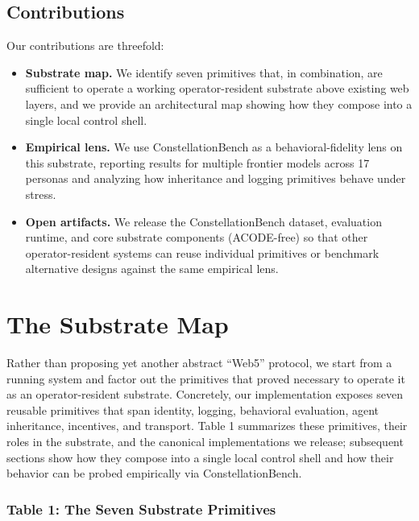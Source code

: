 \documentclass{article}
\providecommand{\tightlist}{\setlength{\itemsep}{0pt}\setlength{\parskip}{0pt}}
\begin{document}
\subsection{Contributions}\label{contributions}

Our contributions are threefold:

\begin{itemize}
\tightlist
\item
  \textbf{Substrate map.} We identify seven primitives that, in
  combination, are sufficient to operate a working operator-resident
  substrate above existing web layers, and we provide an architectural
  map showing how they compose into a single local control shell.
\item
  \textbf{Empirical lens.} We use ConstellationBench as a
  behavioral-fidelity lens on this substrate, reporting results for
  multiple frontier models across 17 personas and analyzing how
  inheritance and logging primitives behave under stress.
\item
  \textbf{Open artifacts.} We release the ConstellationBench dataset,
  evaluation runtime, and core substrate components (ACODE-free) so that
  other operator-resident systems can reuse individual primitives or
  benchmark alternative designs against the same empirical lens.
\end{itemize}

\section{The Substrate Map}\label{the-substrate-map}

Rather than proposing yet another abstract ``Web5'' protocol, we start
from a running system and factor out the primitives that proved
necessary to operate it as an operator-resident substrate. Concretely,
our implementation exposes seven reusable primitives that span identity,
logging, behavioral evaluation, agent inheritance, incentives, and
transport. Table 1 summarizes these primitives, their roles in the
substrate, and the canonical implementations we release; subsequent
sections show how they compose into a single local control shell and how
their behavior can be probed empirically via ConstellationBench.

\subsubsection{Table 1: The Seven Substrate
Primitives}\label{table-1-the-seven-substrate-primitives}
\end{document}
